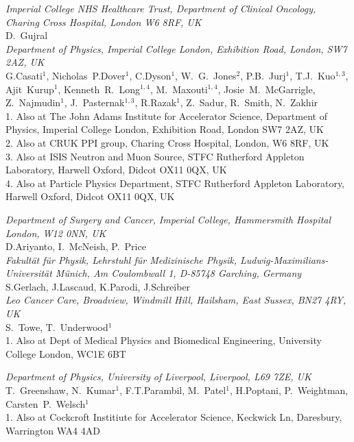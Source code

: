\noindent \textit{Imperial College NHS Healthcare Trust, Department of Clinical Oncology, Charing Cross Hospital, London W6 8RF, UK} \\
D.~Gujral \\
 
\noindent \textit{Department of Physics, Imperial College London, Exhibition Road, London, SW7 2AZ, UK} \\
G.Casati$^{1}$, Nicholas~P.Dover$^{1}$, C.Dyson$^{1}$, W.~G.~Jones$^{2}$, P.B.~Jurj$^{1}$, T.J.~Kuo$^{1, 3}$, Ajit~Kurup$^{1}$, Kenneth~R.~Long$^{1, 4}$, M.~Maxouti$^{1, 4}$, Josie~M.~McGarrigle, Z.~Najmudin$^{1}$, J.~Pasternak$^{1, 3}$, R.Razak$^{1}$, Z.~Sadur, R.~Smith, N.~Zakhir \\
{\footnotesize
  1. Also at The John Adams Institute for Accelerator Science, Department of Physics, Imperial College London, Exhibition Road, London SW7 2AZ, UK \\
  2. Also at CRUK PPI group, Charing Cross Hospital, London, W6 8RF, UK \\
  3. Also at ISIS Neutron and Muon Source, STFC Rutherford Appleton Laboratory, Harwell Oxford, Didcot OX11 0QX, UK \\
  4. Also at Particle Physics Department, STFC Rutherford Appleton Laboratory, Harwell Oxford, Didcot OX11 0QX, UK \\
}
 
\noindent \textit{Department of Surgery and Cancer, Imperial College, Hammersmith Hospital London, W12 0NN, UK} \\
D.Ariyanto, I.~McNeish, P.~Price \\
 
\noindent \textit{Fakult\"at f\"ur Physik, Lehrstuhl f\"ur Medizinische Physik, Ludwig-Maximilians-Universit\"at M\"unich, Am Coulombwall 1, D-85748 Garching, Germany} \\
S.Gerlach, J.Lascaud, K.Parodi, J.Schreiber \\
 
\noindent \textit{Leo Cancer Care, Broadview, Windmill Hill, Hailsham, East Sussex, BN27 4RY, UK} \\
S.~Towe, T.~Underwood$^{1}$ \\
{\footnotesize
  1. Also at Dept of Medical Physics and Biomedical Engineering, University College London, WC1E 6BT \\
}
 
\noindent \textit{Department of Physics, University of Liverpool, Liverpool, L69 7ZE, UK} \\
T.~Greenshaw, N.~Kumar$^{1}$, F.T.Parambil, M.~Patel$^{1}$, H.Poptani, P.~Weightman, Carsten~P.~Welsch$^{1}$ \\
{\footnotesize
  1. Also at Cockcroft Institiute for Accelerator Science, Keckwick Ln, Daresbury, Warrington WA4 4AD \\
}
 

